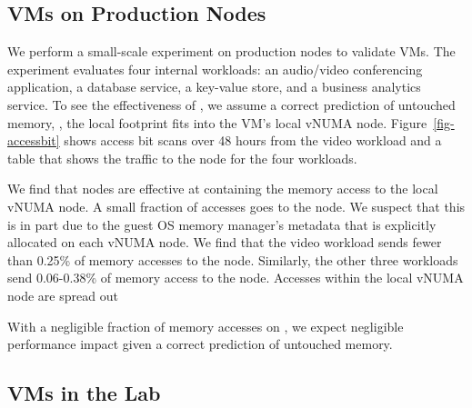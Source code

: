 \begin{comment}
\myparagraph{Implications} The maximum bandwidth usage of a single
workload (42GB/s) validates \sys's design decision to not interleave VMs
across CXL links.  An individual CXL \tms{8} link (40GB/s) appears to be
sufficient for a single VM.  However, multiple VMs can easily exceed the
bandwidth of a CXL \tms{8} link, which validates \sys's design to
connect multiple EMCs to each CPU socket.
\end{comment}



\subsection{\cvn VMs on Production Nodes}
\label{sec:eval:accessbit}

We perform a small-scale experiment on \azure production nodes to validate \cvn VMs.
The experiment evaluates four internal workloads:
an audio/video conferencing application,
a database service, a key-value store, and a business analytics service.
To see the effectiveness of \cvn, we assume a correct prediction of untouched memory, \ie, the local footprint fits into the VM's local vNUMA node.
Figure~\ref{fig-accessbit} shows access bit scans over 48 hours from the video workload and a table that shows the traffic to the \cvn node for the four workloads.

\myfinding{}
We find that \cvn nodes are effective at containing the memory access to the local vNUMA node.
A small fraction of accesses goes to the \cvn node.
We suspect that this is in part due to the guest OS memory manager's metadata that is explicitly allocated on each vNUMA node.
We find that the video workload sends fewer than 0.25\% of memory accesses to the \cvn node.
Similarly, the other three workloads send 0.06-0.38\% of memory access to the \cvn node.
Accesses within the local vNUMA node are spread out

With a negligible fraction of memory accesses on \cvn, we expect negligible performance impact given a correct prediction of untouched memory.


\subsection{\cvn VMs in the Lab}
%
\label{sec-eval-split}



%

